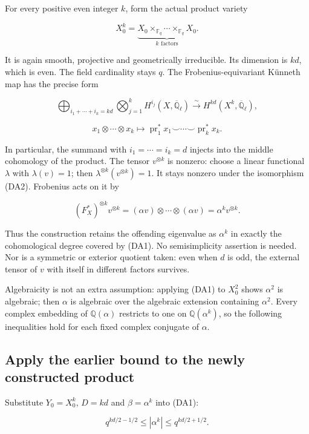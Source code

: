 For every positive even integer \(k\), form the actual product variety

\[X_0^k=\underbrace{X_0\times_{\mathbb F_q}\cdots\times_{\mathbb F_q}X_0}_{k\text{ factors}}.\]

It is again smooth, projective and geometrically irreducible. Its
dimension is \(kd\), which is even. The field cardinality stays
\textbf{\(q\)}. The Frobenius-equivariant Künneth map has the precise
form

\[\bigoplus_{i_1+\cdots+i_k=kd}\bigotimes_{j=1}^kH^{i_j}(X,\overline{\mathbb Q}_\ell)
\xrightarrow{\sim}H^{kd}(X^k,\overline{\mathbb Q}_\ell),\]

\[x_1\otimes\cdots\otimes x_k\longmapsto
\operatorname{pr}_1^*x_1\smile\cdots\smile\operatorname{pr}_k^*x_k.\tag{DA2}\]

In particular, the summand with \(i_1=\cdots=i_k=d\) injects into the
middle cohomology of the product. The tensor \(v^{\otimes k}\) is
nonzero: choose a linear functional \(\lambda\) with \(\lambda(v)=1\);
then \(\lambda^{\otimes k}(v^{\otimes k})=1\). It stays nonzero under
the isomorphism (DA2). Frobenius acts on it by

\[(F_X^*)^{\otimes k}v^{\otimes k}
=(\alpha v)\otimes\cdots\otimes(\alpha v)
=\alpha^k v^{\otimes k}.\tag{DA3}\]

Thus the construction retains the offending eigenvalue as \(\alpha^k\)
in exactly the cohomological degree covered by (DA1). No semisimplicity
assertion is needed. Nor is a symmetric or exterior quotient taken: even
when \(d\) is odd, the external tensor of \(v\) with itself in different
factors survives.

Algebraicity is not an extra assumption: applying (DA1) to \(X_0^2\)
shows \(\alpha^2\) is algebraic; then \(\alpha\) is algebraic over the
algebraic extension containing \(\alpha^2\). Every complex embedding of
\(\mathbb Q(\alpha)\) restricts to one on \(\mathbb Q(\alpha^k)\), so
the following inequalities hold for each fixed complex conjugate of
\(\alpha\).

\subsection{Apply the earlier bound to the newly constructed
product}\label{apply-the-earlier-bound-to-the-newly-constructed-product}

Substitute \(Y_0=X_0^k\), \(D=kd\) and \(\beta=\alpha^k\) into (DA1):

\[q^{kd/2-1/2}\le |\alpha^k|\le q^{kd/2+1/2}.\tag{DA4}\]

